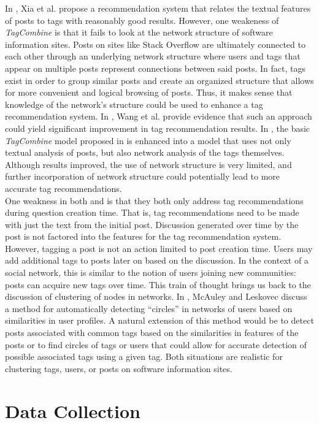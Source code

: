 \documentclass[10pt, final]{article}
\newcommand{\br}[1][.75]{\ \\[#1\baselineskip]}
\begin{document}
In \cite{1}, Xia et al. propose a recommendation system that relates the textual features of posts to tags with reasonably good results. However, one weakeness of \textit{TagCombine} is that it fails to look at the network structure of software information sites. Posts on sites like Stack Overflow are ultimately connected to each other through an underlying network structure where users and tags that appear on multiple posts represent connections between said posts. In fact, tags exist in order to group similar posts and create an organized structure that allows for more convenient and logical browsing of posts. Thus, it makes sense that knowledge of the network's structure could be used to enhance a tag recommendation system. In \cite{5}, Wang et al. provide evidence that such an approach could yield significant improvement in tag recommendation results. In \cite{5}, the basic \textit{TagCombine} model proposed in \cite{1} is enhanced into a model that uses not only textual analysis of posts, but also network analysis of the tags themselves. Although results improved, the use of network structure is very limited, and further incorporation of network structure could potentially lead to more accurate tag recommendations.\br
One weakness in both \cite{1} and \cite{5} is that they both only address tag recommendations during question creation time. That is, tag recommendations need to be made with just the text from the initial post. Discussion generated over time by the post is not factored into the features for the tag recommendation system. However, tagging a post is not an action limited to post creation time. Users may add additional tags to posts later on based on the discussion. In the context of a social network, this is similar to the notion of users joining new communities: posts can acquire new tags over time. This train of thought brings us back to the discussion of clustering of nodes in networks. In \cite{2}, McAuley and Leskovec discuss a method for automatically detecting ``circles'' in networks of users based on similarities in user profiles. A natural extension of this method would be to detect posts associated with common tags based on the similarities in features of the posts or to find circles of tags or users that could allow for accurate detection of possible associated tags using a given tag. Both situations are realistic for clustering tags, users, or posts on software information sites.


\section{Data Collection}
\end{document}
